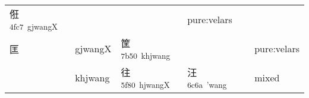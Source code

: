 \documentclass[14pt,a4paper]{scrartcl}
\begin{document}
\begin{longtable}[c]{@{}llllll@{}}
\begin{minipage}[t]{0.14\columnwidth}
俇\textsuperscript{4fc7~gjwangX}
\strut\end{minipage} &
\begin{minipage}[t]{0.14\columnwidth}\raggedright\strut
\strut\end{minipage} &
\begin{minipage}[t]{0.14\columnwidth}\raggedright\strut
\strut\end{minipage} &
\begin{minipage}[t]{0.14\columnwidth}\raggedright\strut
pure:velars
\strut\end{minipage}\tabularnewline
\begin{minipage}[t]{0.14\columnwidth}\raggedright\strut
匡
\strut\end{minipage} &
\begin{minipage}[t]{0.14\columnwidth}\raggedright\strut
gjwangX
\strut\end{minipage} &
\begin{minipage}[t]{0.14\columnwidth}\raggedright\strut
筐\textsuperscript{7b50~khjwang}
\strut\end{minipage} &
\begin{minipage}[t]{0.14\columnwidth}\raggedright\strut
\strut\end{minipage} &
\begin{minipage}[t]{0.14\columnwidth}\raggedright\strut
\strut\end{minipage} &
\begin{minipage}[t]{0.14\columnwidth}\raggedright\strut
pure:velars
\strut\end{minipage}\tabularnewline
\begin{minipage}[t]{0.14\columnwidth}\raggedright\strut
𡉚
\strut\end{minipage} &
\begin{minipage}[t]{0.14\columnwidth}\raggedright\strut
khjwang
\strut\end{minipage} &
\begin{minipage}[t]{0.14\columnwidth}\raggedright\strut
往\textsuperscript{5f80~hjwangX}
\strut\end{minipage} &
\begin{minipage}[t]{0.14\columnwidth}\raggedright\strut
汪\textsuperscript{6c6a~'wang}
\strut\end{minipage} &
\begin{minipage}[t]{0.14\columnwidth}\raggedright\strut
\strut\end{minipage} &
\begin{minipage}[t]{0.14\columnwidth}\raggedright\strut
mixed
\strut\end{minipage}\tabularnewline
\bottomrule
\end{longtable}
\end{document}
